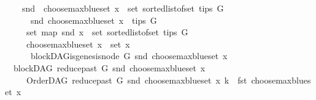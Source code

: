 \begin{isabellebody}
\ \ \ \ {\isachardoublequoteopen}snd\ \ {\isacharparenleft}{\kern0pt}choose{\isacharunderscore}{\kern0pt}max{\isacharunderscore}{\kern0pt}blue{\isacharunderscore}{\kern0pt}set\ x{\isacharparenright}{\kern0pt}\ {\isasymin}\ set\ {\isacharparenleft}{\kern0pt}sorted{\isacharunderscore}{\kern0pt}list{\isacharunderscore}{\kern0pt}of{\isacharunderscore}{\kern0pt}set\ {\isacharparenleft}{\kern0pt}tips\ G{\isacharparenright}{\kern0pt}{\isacharparenright}{\kern0pt}{\isachardoublequoteclose}\ \isanewline
\ \ \ \ \ \ {\isachardoublequoteopen}snd\ {\isacharparenleft}{\kern0pt}choose{\isacharunderscore}{\kern0pt}max{\isacharunderscore}{\kern0pt}blue{\isacharunderscore}{\kern0pt}set\ x{\isacharparenright}{\kern0pt}\ {\isasymin}\ tips\ G{\isachardoublequoteclose}\isanewline
\ \ \ \ \ {\isachardoublequoteopen}set\ {\isacharparenleft}{\kern0pt}map\ snd\ x{\isacharparenright}{\kern0pt}\ {\isacharequal}{\kern0pt}\ set\ {\isacharparenleft}{\kern0pt}sorted{\isacharunderscore}{\kern0pt}list{\isacharunderscore}{\kern0pt}of{\isacharunderscore}{\kern0pt}set\ {\isacharparenleft}{\kern0pt}tips\ G{\isacharparenright}{\kern0pt}{\isacharparenright}{\kern0pt}{\isachardoublequoteclose}\isanewline
\ \ \ \ \ {\isachardoublequoteopen}choose{\isacharunderscore}{\kern0pt}max{\isacharunderscore}{\kern0pt}blue{\isacharunderscore}{\kern0pt}set\ x\ {\isasymin}\ set\ x{\isachardoublequoteclose}\isanewline
\ \ \ \ \ {\isachardoublequoteopen}{\isasymnot}\ blockDAG{\isachardot}{\kern0pt}is{\isacharunderscore}{\kern0pt}genesis{\isacharunderscore}{\kern0pt}node\ G\ {\isacharparenleft}{\kern0pt}snd\ {\isacharparenleft}{\kern0pt}choose{\isacharunderscore}{\kern0pt}max{\isacharunderscore}{\kern0pt}blue{\isacharunderscore}{\kern0pt}set\ x{\isacharparenright}{\kern0pt}{\isacharparenright}{\kern0pt}\ {\isasymLongrightarrow}\isanewline
\ \ blockDAG\ {\isacharparenleft}{\kern0pt}reduce{\isacharunderscore}{\kern0pt}past\ G\ {\isacharparenleft}{\kern0pt}snd\ {\isacharparenleft}{\kern0pt}choose{\isacharunderscore}{\kern0pt}max{\isacharunderscore}{\kern0pt}blue{\isacharunderscore}{\kern0pt}set\ x{\isacharparenright}{\kern0pt}{\isacharparenright}{\kern0pt}{\isacharparenright}{\kern0pt}{\isachardoublequoteclose}\isanewline
\ \ \ \ \ {\isachardoublequoteopen}OrderDAG\ {\isacharparenleft}{\kern0pt}reduce{\isacharunderscore}{\kern0pt}past\ G\ {\isacharparenleft}{\kern0pt}snd\ {\isacharparenleft}{\kern0pt}choose{\isacharunderscore}{\kern0pt}max{\isacharunderscore}{\kern0pt}blue{\isacharunderscore}{\kern0pt}set\ x{\isacharparenright}{\kern0pt}{\isacharparenright}{\kern0pt}{\isacharparenright}{\kern0pt}\ k\ {\isacharequal}{\kern0pt}\ fst\ {\isacharparenleft}{\kern0pt}choose{\isacharunderscore}{\kern0pt}max{\isacharunderscore}{\kern0pt}blue{\isacharunderscore}{\kern0pt}set\ x{\isacharparenright}{\kern0pt}{\isachardoublequoteclose}\isanewline

\end{isabellebody}
